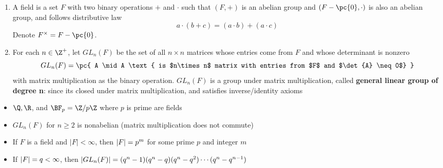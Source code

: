 \documentclass[11pt]{article}
\begin{document}
\begin{definition*}
    \begin{enumerate}
        \item {} A field is a set $F$ with two binary operations $+$ and $\cdot$ such that $(F,+)$ is an abelian group and $(F-\pc{0}, \cdot)$ is also an abelian group, and follows distributive law 
        \[
            a\cdot (b+c) = (a\cdot b) + (a\cdot c)    
        \]
        Denote $F^{\times} = F - \pc{0}$. 
        \item {} For each $n\in\Z^+$, let $GL_n(F)$ be the set of all $n\times n$ matrices whose entries come from $F$ and whose determinant is nonzero
        \[
            GL_n(F) = \pc{
                A \mid A \text{ is $n\times n$ matrix with entries from $F$ and $\det{A} \neq 0$}
            }
        \]
        with matrix multiplication as the binary operation. $GL_n(F)$ is a group under matrix multiplication, called \textbf{general linear group of degree n}: since its closed under matrix multiplication, and satisfies inverse/identity axioms
    \end{enumerate}
    \begin{itemize}
        \item {} $\Q,\R$, and $\BF_p = \integermodn[p]$ where $p$ is prime are fields
        \item {} $GL_n(F)$ for $n\geq 2$ is nonabelian (matrix multiplication does not commute)
        \item {} If $F$ is a field and $|F| < \infty$, then $\left|F\right| = p^m$ for some prime $p$ and integer $m$
        \item {} If $\left|F\right| = q < \infty$, then $\left|GL_n(F)\right| = (q^n - 1)(q^n - q)(q^n-q^2) \cdots (q^n - q^{n-1})$ 
    \end{itemize}
\end{definition*}



\section{}
\end{document}
